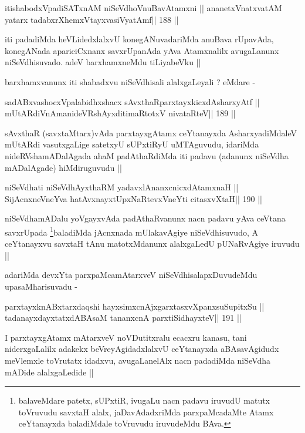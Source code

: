 \begin{shl}
itishabodxVpadiSATxnAM niSeVdhoV\s nuBavAtamxni ||
ananetxV\s natxvatAM yatarx tadabxrXhemxVtayxvasiVyatAmf\hfill || 188 ||
\end{shl}

\begin{artha}
iti padadiMda heVLidedxlalxvU konegANuvadariMda anuBava rUpavAda,
konegANada apariciCxnanx savxrUpanAda yAva Atamxnalilx avugaLanunx
niSeVdhisuvado. adeV barxhamxneMdu tiLiyabeVku ||

barxhamxvanunx iti shabadxvu niSeVdhisali alalxgaLeyali ? eMdare -
\end{artha}

\begin{shl}
sadABxvashocxVpalabidhxshacx sAvxthaRparxtayxkicxdAsharxyAtf ||
mUtARdiVnAmanideVRshAyxditimaRtotxV nivataRteV\hfill || 189 ||
\end{shl}

\begin{artha}
sAvxthaR (savxtaMtarx)vAda parxtayxgAtamx ceYtanayxda AsharxyadiMdaleV
mUtARdi vasutxgaLige satetxyU sUPxtiRyU uMTAguvudu, idariMda
nideRVshamADalAgada ahaM padAthaRdiMda iti padavu (adanunx niSeVdha
mADalAgade) hiMdiruguvudu ||
\end{artha}

\begin{shl}
niSeVdhati niSeVdhAyxthaRM yadavxlAnanxcnicxdAtamxnaH ||
SijAcnxneVneYva hatAvx\s nayxtUpxNaRtevxVneYti citasxvXtaH\hfill || 190 ||
\end{shl}

\begin{artha}
niSeVdhamADalu yoVgayxvAda padAthaRvanunx nacn padavu yAva ceVtana
savxrUpada  \footnote[1]{balaveMdare patetx, sUPxtiR, ivugaLu nacn
  padavu iruvudU matutx toVruvudu savxtaH alalx, jaDavAdadxriMda
  parxpaMcadaMte Atamx ceYtanayxda baladiMdale toVruvudu iruvudeMdu BAva.}baladiMda jAcnxnada mUlakavAgiye
niSeVdhisuvudo, A ceYtanayxvu savxtaH tAnu matotxMdanunx alalxgaLedU
pUNaRvAgiye iruvudu ||

adariMda devxYta parxpaMcamAtarxveV niSeVdhisalapxDuvudeMdu
upasaMharisuvadu -
\end{artha}

\begin{shl}
parxtayxknABxtarxdaqshi hayxsimxcnAjxgarxtasxvXpanxsuSupitxSu ||
tadanayxdayxtatxdABAsaM tananxcnA parxtiSidhayxteV\hfill || 191 ||
\end{shl}

\begin{artha}
I parxtayxgAtamx mAtarxveV noVDutitxralu ecacxru kanasu, tani
niderxgaLalilx adakekx beVreyAgidadxlalxvU ceYtanayxda aBAsavAgidudx
meVlemxle toVrutatx idadxvu, avugaLanelAlx nacn padadiMda niSeVdha
mADide alalxgaLedide ||
\end{artha}

